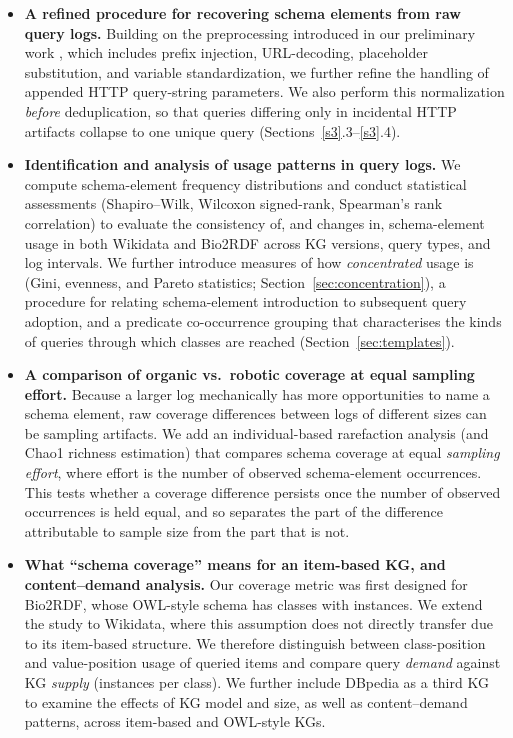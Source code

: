 \documentclass[sw]{iosart2x}
\begin{document}
\begin{itemize}
\item \textbf{A refined procedure for recovering schema elements from raw query logs.} Building on the preprocessing introduced in our preliminary work \cite{mohammadi2024analyzing}, which includes prefix injection, URL-decoding, placeholder substitution, and variable standardization, we further refine the handling of appended HTTP query-string parameters.  We also perform this normalization \emph{before} deduplication, so that queries differing only in incidental HTTP artifacts collapse to one unique query (Sections~\ref{s3}.3--\ref{s3}.4).

\item \textbf{Identification and analysis of usage patterns in query logs.} We compute schema-element frequency distributions and conduct statistical assessments (Shapiro--Wilk, Wilcoxon signed-rank, Spearman's rank correlation) to evaluate the consistency of, and changes in, schema-element usage in both Wikidata and Bio2RDF across KG versions, query types, and log intervals. We further introduce measures of how \emph{concentrated} usage is (Gini, evenness, and Pareto statistics; Section~\ref{sec:concentration}), a procedure for relating schema-element introduction to subsequent query adoption, and a predicate co-occurrence grouping that characterises the kinds of queries through which classes are reached (Section~\ref{sec:templates}).

\item \textbf{A comparison of organic vs.\ robotic coverage at equal sampling effort.} Because a larger log mechanically has more opportunities to name a schema element, raw coverage differences between logs of different sizes can be sampling artifacts. We add an individual-based rarefaction analysis (and Chao1 richness estimation) that compares schema coverage at equal \emph{sampling effort}, where effort is the number of observed schema-element occurrences. This tests whether a coverage difference persists once the number of observed occurrences is held equal, and so separates the part of the difference attributable to sample size from the part that is not.

\item \textbf{What ``schema coverage'' means for an item-based KG, and content--demand analysis.} Our coverage metric was first designed for Bio2RDF, whose OWL-style schema has classes with instances. We extend the study to Wikidata, where this assumption does not directly transfer due to its item-based structure. We therefore distinguish between class-position and value-position usage of queried items and compare query \emph{demand} against KG \emph{supply} (instances per class). We further include DBpedia as a third KG to examine the effects of KG model and size, as well as content--demand patterns, across item-based and OWL-style KGs.


\end{itemize}
\end{document}
